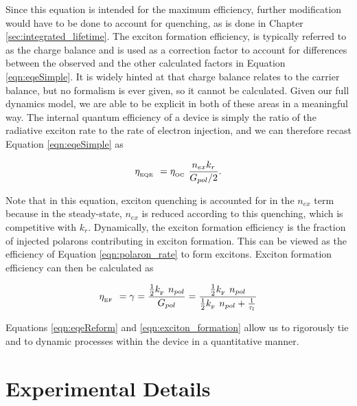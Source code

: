 \documentclass[../thesis.tex]{subfiles}
\begin{document}
Since this equation is intended for the maximum efficiency, further modification would have to be done to account for quenching, as is done in Chapter \ref{sec:integrated_lifetime}.
The exciton formation efficiency, \ef is typically referred to as the charge balance and is used as a correction factor to account for differences between the observed \eqe and the other calculated factors in Equation \ref{eqn:eqeSimple}.
It is widely hinted at that charge balance relates to the carrier balance, but no formalism is ever given, so it cannot be calculated.
Given our full dynamics model, we are able to be explicit in both of these areas in a meaningful way.  
The internal quantum efficiency of a device is simply the ratio of the radiative exciton rate to the rate of electron injection, and we can therefore recast Equation \ref{eqn:eqeSimple} as


\begin{equation}
\eta_{_\text{\tiny EQE}}\ =\eta_{_\text{\tiny OC}}\  \frac{n_{ex}k_r}{G_{pol}/2}.
\label{eqn:eqeReform}
\end{equation}

Note that in this equation, exciton quenching is accounted for in the $n_{ex}$ term because in the steady-state, $n_{ex}$ is reduced according to this quenching, which is competitive with $k_r$.
Dynamically, the exciton formation efficiency is the fraction of injected polarons contributing in exciton formation.  
This can be viewed as the efficiency of Equation \ref{eqn:polaron_rate} to form excitons.
Exciton formation efficiency can then be calculated as

\begin{equation}
\eta_{_\text{\tiny EF}}\ =\gamma = \frac{\frac{1}{2}k_{_\text{\tiny F}}\  n_{pol}}{G_{pol}}=\frac{\frac{1}{2}k_{_\text{\tiny F}}\  n_{pol}}{\frac{1}{2}k_{_\text{\tiny F}}\  n_{pol}+\frac{1}{\tau_l}}
\label{eqn:exciton_formation_polarons}
\end{equation}

Equations \ref{eqn:eqeReform} and \ref{eqn:exciton_formation} allow us to rigorously tie \eqe and \ef to dynamic processes within the device in a quantitative manner.

\section{Experimental Details} \label{sec:experimental_details}
\end{document}
